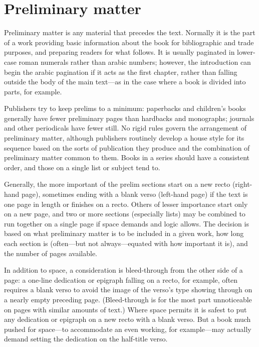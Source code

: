 \section{Preliminary matter}

Preliminary matter is any material that precedes the text. Normally it is
the part of a work providing basic information about the book for
bibliographic and trade purposes, and preparing readers for what
follows. It is usually paginated in lower-case roman numerals rather
than arabic numbers; however, the introduction can begin the arabic
pagination if it acts as the first chapter, rather than falling outside the
body of the main text—as in the case where a book is divided into parts,
for example.

Publishers try to keep prelims to a minimum: paperbacks and children's
books generally have fewer preliminary pages than hardbacks and
monographs; journals and other periodicals have fewer still. No rigid
rules govern the arrangement of preliminary matter, although publishers
routinely develop a house style for its sequence based on the sorts of
publication they produce and the combination of preliminary matter
common to them. Books in a series should have a consistent order, and
those on a single list or subject tend to.

Generally, the more important of the prelim sections start on a new recto
(right-hand page), sometimes ending with a blank verso (left-hand page)
if the text is one page in length or finishes on a recto. Others of lesser
importance start only on a new page, and two or more sections (especially
lists) may be combined to run together on a single page if space
demands and logic allows. The decision is based on what preliminary
matter is to be included in a given work, how long each section is
(often---but not always---equated with how important it is), and the
number of pages available.

In addition to space, a consideration is bleed-through from the other
side of a page: a one-line dedication or epigraph falling on a recto, for
example, often requires a blank verso to avoid the image of the verso's
type showing through on a nearly empty preceding page. (Bleed-through
is for the most part unnoticeable on pages with similar amounts of text.)
Where space permits it is safest to put any dedication or epigraph on a
new recto with a blank verso. But a book much pushed for space---to
accommodate an even working, for example---may actually demand
setting the dedication on the half-title verso.

